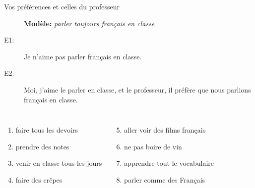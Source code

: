 \documentclass{beamer}
\begin{document}
  \begin{frame}{Vos préférences et celles du professeur}
    \begin{description}
      \item[] \textbf{Modèle:} \emph{parler toujours français en classe}
      \item[E1:] Je n'aime pas parler français en classe.
      \item[E2:] Moi, j'aime le parler en classe, et le professeur, il préfère \alert{que nous parlions} français en classe.
    \end{description}
    \begin{columns}
        \begin{enumerate}
          \item faire tous les devoirs
          \item prendre des notes
          \item venir en classe tous les jours
          \item faire des crêpes
        \end{enumerate}
        \begin{enumerate}
          \setcounter{enumi}{4}
          \item aller voir des films français
          \item ne pas boire de vin
          \item apprendre tout le vocabulaire
          \item parler comme des Français
        \end{enumerate}
    \end{columns}
  \end{frame}
\end{document}
